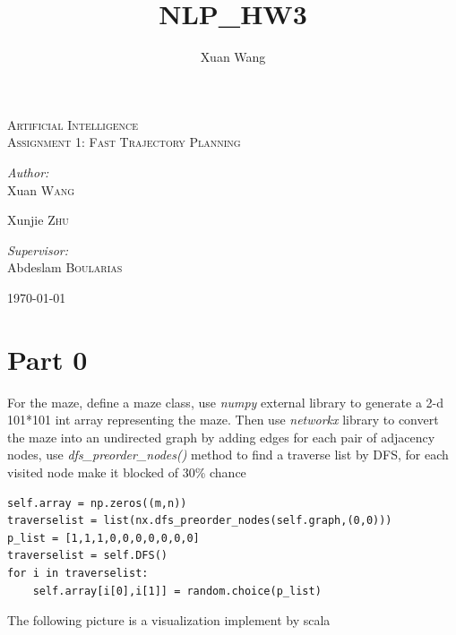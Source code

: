 \documentclass[12pt]{amsart}
\title{NLP_HW3}
\author{Xuan Wang}
\date{} %
\begin{document}
\begin{titlepage}

\begin{center}



\textsc{\LARGE Artificial Intelligence}\\[1.5cm]

\textsc{\Large Assignment 1: Fast Trajectory Planning}\\[0.5cm]


\begin{minipage}{0.4\textwidth}
\begin{flushleft} \large
\emph{Author:}\\
Xuan \textsc{Wang}

Xunjie \textsc{Zhu}
\end{flushleft}
\end{minipage}
\begin{minipage}{0.4\textwidth}
\begin{flushright} \large
\emph{Supervisor:} \\
Abdeslam  \textsc{Boularias}
\end{flushright}
\end{minipage}

\vfill

{\large \today}

\end{center}

\end{titlepage}

\section*{Part 0}
For the maze, define a maze class, use \emph{numpy} external library to generate a 2-d 101*101 int array representing the maze. Then use \emph{networkx} library to convert the maze into an undirected graph by adding edges for each pair of adjacency nodes, use \emph{dfs\_preorder\_nodes()} method to find a traverse list by DFS, for each visited node make it blocked of 30\% chance
\begin{lstlisting}
self.array = np.zeros((m,n))
traverselist = list(nx.dfs_preorder_nodes(self.graph,(0,0)))
p_list = [1,1,1,0,0,0,0,0,0,0]
traverselist = self.DFS()
for i in traverselist:
	self.array[i[0],i[1]] = random.choice(p_list)
\end{lstlisting}
The following picture is a visualization implement by scala
\end{document}
